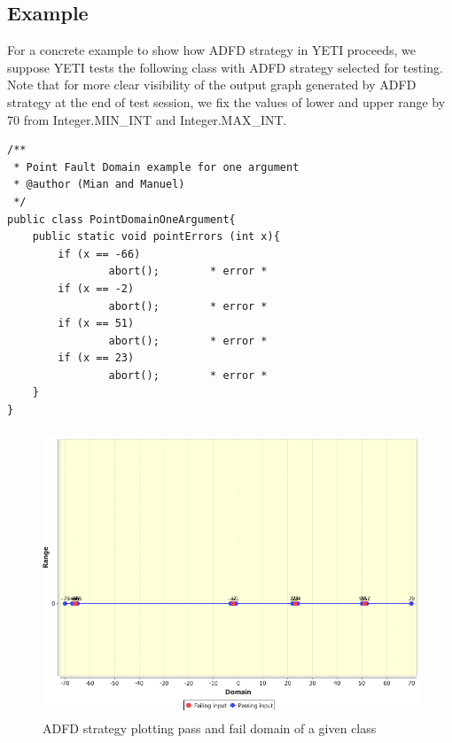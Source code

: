  

\subsection{Example}\label{sec:example}
For a concrete example to show how ADFD strategy in YETI proceeds, we suppose YETI tests the following class with ADFD strategy selected for testing. Note that for more clear visibility of the output graph generated by ADFD strategy at the end of test session, we fix the values of lower and upper range by 70 from Integer.MIN\_INT and Integer.MAX\_INT. 

\begin{lstlisting}
/**
 * Point Fault Domain example for one argument
 * @author (Mian and Manuel)
 */
public class PointDomainOneArgument{
	public static void pointErrors (int x){
 		if (x == -66) 
			 	abort(); 		* error *
		if (x == -2) 
			 	abort(); 		* error *
 		if (x == 51) 
			 	abort(); 		* error *
		if (x == 23) 
			 	abort(); 		* error *
	}
}
\end{lstlisting}


\begin{figure}[H]
\centering
\includegraphics[width=12.2cm,height=8.5cm]{chapter5/pointDomainOneArgument.png}
\caption{ADFD strategy plotting pass and fail domain of a given class}
\label{fig:ADFD-example}
\end{figure}

